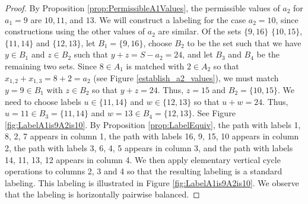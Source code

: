 \documentclass[10pt, reqno]{amsart}
\theoremstyle{definition}
\theoremstyle{plain}
\begin{document}
\begin{proof}
By Proposition \ref{prop:PermissibleA1Values}, the permissible values of $a_2$ for $a_1=9$ are $10, 11$, and $13$. We will construct a labeling for the case $a_2=10$, since constructions using the other values of $a_2$ are similar.
Of the sets $\{9,16\}$
$\{10,15\}$, $\{11,14\}$ and $\{12,13\}$,
let $B_1=\{9,16\}$, choose $B_2$ to be the set   
such that we have $y\in B_1$ and $z\in B_2$ 
such that $y+z=S-a_2=24$, and let $B_3$ and $B_4$ be the remaining two sets.
Since $8\in A_1$ is matched with $2\in A_2$ so that
$x_{1,2}+x_{1,3}=8+2=a_2$ (see Figure \ref{establish_a2_values}), we must match $y=9\in B_1$
with $z\in B_2$ so that $y+z=24$.
Thus, $z=15$ and $B_2=\{10,15\}$.
We need to choose labels $u\in \{11,14\}$
and $w\in\{12,13\}$ so that $u+w=24$.
Thus, $u=11\in B_3=\{11,14\}$ and $w=13\in B_4=\{12,13\}$.
See Figure \ref{fig:LabelA1is9A2is10}.
By Proposition \ref{prop:LabelEquiv}, the path with labels 1, 8, 2, 7 appears in column 1, 
the path with labels 16, 9, 15, 10 appears in column 2,
the path with labels 3, 6, 4, 5 appears in column 3,
and
the path with labels 14, 11, 13, 12 appears in column 4.
We then apply elementary vertical cycle operations to
columns 2, 3 and 4 so that the resulting labeling is a standard labeling.
This labeling is illustrated in Figure  
\ref{fig:LabelA1is9A2is10}.
We observe that the labeling is horizontally pairwise balanced.


\end{proof}
\end{document}
